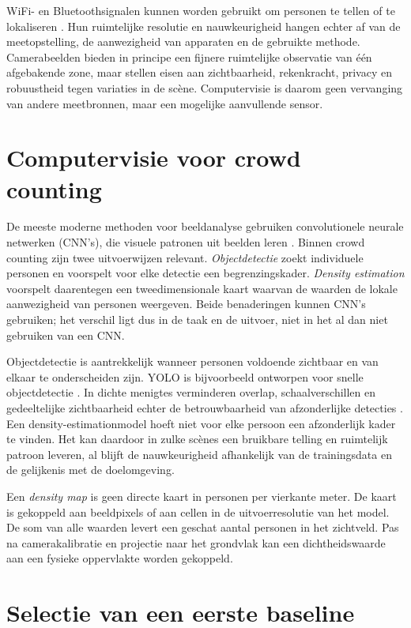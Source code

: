 WiFi- en Bluetoothsignalen kunnen worden gebruikt om personen te tellen of te lokaliseren \autocite{GuillenPerez2019}. Hun ruimtelijke resolutie en nauwkeurigheid hangen echter af van de meetopstelling, de aanwezigheid van apparaten en de gebruikte methode. Camerabeelden bieden in principe een fijnere ruimtelijke observatie van één afgebakende zone, maar stellen eisen aan zichtbaarheid, rekenkracht, privacy en robuustheid tegen variaties in de scène. Computervisie is daarom geen vervanging van andere meetbronnen, maar een mogelijke aanvullende sensor.

\section{Computervisie voor crowd counting}

De meeste moderne methoden voor beeldanalyse gebruiken convolutionele neurale netwerken (CNN's), die visuele patronen uit beelden leren \autocite{OShea2015}. Binnen crowd counting zijn twee uitvoerwijzen relevant. \emph{Objectdetectie} zoekt individuele personen en voorspelt voor elke detectie een begrenzingskader. \emph{Density estimation} voorspelt daarentegen een tweedimensionale kaart waarvan de waarden de lokale aanwezigheid van personen weergeven. Beide benaderingen kunnen CNN's gebruiken; het verschil ligt dus in de taak en de uitvoer, niet in het al dan niet gebruiken van een CNN.

Objectdetectie is aantrekkelijk wanneer personen voldoende zichtbaar en van elkaar te onderscheiden zijn. YOLO is bijvoorbeeld ontworpen voor snelle objectdetectie \autocite{Redmon2016}. In dichte menigtes verminderen overlap, schaalverschillen en gedeeltelijke zichtbaarheid echter de betrouwbaarheid van afzonderlijke detecties \autocite{Khan2020}. Een density-estimationmodel hoeft niet voor elke persoon een afzonderlijk kader te vinden. Het kan daardoor in zulke scènes een bruikbare telling en ruimtelijk patroon leveren, al blijft de nauwkeurigheid afhankelijk van de trainingsdata en de gelijkenis met de doelomgeving.

Een \emph{density map} is geen directe kaart in personen per vierkante meter. De kaart is gekoppeld aan beeldpixels of aan cellen in de uitvoerresolutie van het model. De som van alle waarden levert een geschat aantal personen in het zichtveld. Pas na camerakalibratie en projectie naar het grondvlak kan een dichtheidswaarde aan een fysieke oppervlakte worden gekoppeld.

\section{Selectie van een eerste baseline}

